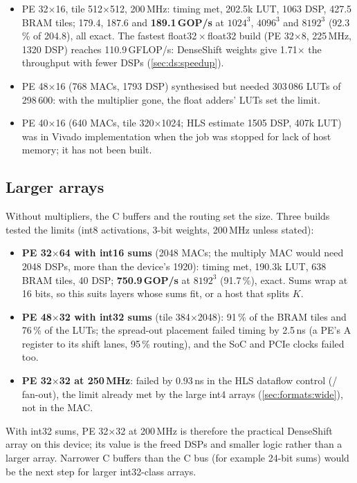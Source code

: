 \begin{itemize}
  \item PE 32\(\times\)16, tile 512\(\times\)512, 200\,MHz: timing met, 202.5k LUT, 1063 DSP, 427.5 BRAM tiles;
        179.4, 187.6 and \textbf{189.1\,GOP/s} at \(1024^3\), \(4096^3\) and \(8192^3\) (92.3\,\% of 204.8),
        all exact. The fastest float32\,\(\times\)\,float32 build (PE 32\(\times\)8, 225\,MHz, 1320 DSP) reaches
        110.9\,GFLOP/s: DenseShift weights give 1.71\(\times\) the throughput with fewer DSPs
        (\cref{sec:ds:speedup}).
  \item PE 48\(\times\)16 (768 MACs, 1793 DSP) synthesised but needed 303\,086 LUTs of 298\,600: with the
        multiplier gone, the float adders' LUTs set the limit.
  \item PE 40\(\times\)16 (640 MACs, tile 320\(\times\)1024; HLS estimate 1505 DSP, 407k LUT) was in Vivado
        implementation when the job was stopped for lack of host memory; it has not been built.
\end{itemize}

\subsection{Larger arrays}
\label{sec:ds:scale}
Without multipliers, the C buffers and the routing set the size. Three builds tested the limits (int8 activations,
3-bit weights, 200\,MHz unless stated):
\begin{itemize}
  \item \textbf{PE 32\(\times\)64 with int16 sums} (2048 MACs; the multiply MAC would need 2048 DSPs, more than the
        device's 1920): timing met, 190.3k LUT, 638 BRAM tiles, 40 DSP; \textbf{750.9\,GOP/s} at \(8192^3\)
        (91.7\,\%), exact. Sums wrap at 16 bits, so this suits layers whose sums fit, or a host that splits \(K\).
  \item \textbf{PE 48\(\times\)32 with int32 sums} (tile 384\(\times\)2048): 91\,\% of the BRAM tiles and
        76\,\% of the LUTs; the spread-out placement failed timing by 2.5\,ns (a PE's A register to its shift lanes,
        95\,\% routing), and the SoC and PCIe clocks failed too.
  \item \textbf{PE 32\(\times\)32 at 250\,MHz}: failed by 0.93\,ns in the HLS dataflow control
        (/ fan-out), the limit already met by the large int4 arrays
        (\cref{sec:formats:wide}), not in the MAC.
\end{itemize}
With int32 sums, PE 32\(\times\)32 at 200\,MHz is therefore the practical DenseShift array on this device; its
value is the freed DSPs and smaller logic rather than a larger array. Narrower C buffers than the C bus (for example
24-bit sums) would be the next step for larger int32-class arrays.

